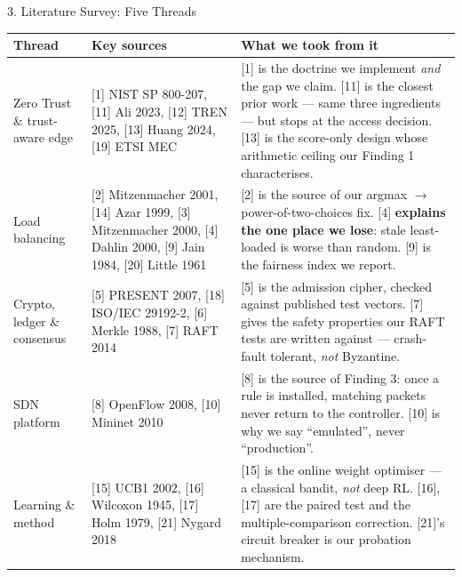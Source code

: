 \documentclass[aspectratio=169, 11pt]{beamer}
\begin{document}
\begin{frame}{3. Literature Survey: Five Threads}
    \centering\tiny
    \begin{tabular}{@{}p{}p{}p{}@{}}
      \toprule
      \textbf{Thread} & \textbf{Key sources} & \textbf{What we took from it}\\
      \midrule
      Zero Trust \& trust-aware edge
        & [1] NIST SP 800-207, [11] Ali 2023, [12] TREN 2025, [13] Huang 2024, [19] ETSI MEC
        & [1] is the doctrine we implement \emph{and} the gap we claim. [11] is the closest prior work --- same three ingredients --- but stops at the access decision. [13] is the score-only design whose arithmetic ceiling our Finding 1 characterises.\\
      \addlinespace[2pt]
      Load balancing
        & [2] Mitzenmacher 2001, [14] Azar 1999, [3] Mitzenmacher 2000, [4] Dahlin 2000, [9] Jain 1984, [20] Little 1961
        & [2] is the source of our argmax $\to$ power-of-two-choices fix. [4] \textbf{explains the one place we lose}: stale least-loaded is worse than random. [9] is the fairness index we report.\\
      \addlinespace[2pt]
      Crypto, ledger \& consensus
        & [5] PRESENT 2007, [18] ISO/IEC 29192-2, [6] Merkle 1988, [7] RAFT 2014
        & [5] is the admission cipher, checked against published test vectors. [7] gives the safety properties our RAFT tests are written against --- crash-fault tolerant, \emph{not} Byzantine.\\
      \addlinespace[2pt]
      SDN platform
        & [8] OpenFlow 2008, [10] Mininet 2010
        & [8] is the source of Finding 3: once a rule is installed, matching packets never return to the controller. [10] is why we say ``emulated'', never ``production''.\\
      \addlinespace[2pt]
      Learning \& method
        & [15] UCB1 2002, [16] Wilcoxon 1945, [17] Holm 1979, [21] Nygard 2018
        & [15] is the online weight optimiser --- a classical bandit, \emph{not} deep RL. [16],[17] are the paired test and the multiple-comparison correction. [21]'s circuit breaker is our probation mechanism.\\
      \bottomrule
    \end{tabular}
\end{frame}
\end{document}
